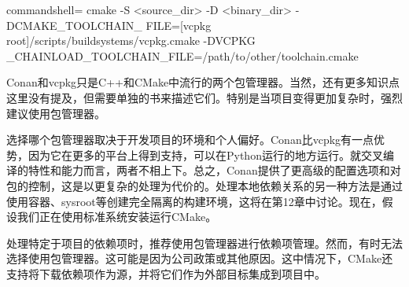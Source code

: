 \begin{tcblisting}{commandshell={}}
cmake -S <source_dir> -D <binary_dir> -DCMAKE_TOOLCHAIN_
  FILE=[vcpkg root]/scripts/buildsystems/vcpkg.cmake -DVCPKG
  _CHAINLOAD_TOOLCHAIN_FILE=/path/to/other/toolchain.cmake
\end{tcblisting}

Conan和vcpkg只是C++和CMake中流行的两个包管理器。当然，还有更多知识点这里没有提及，但需要单独的书来描述它们。特别是当项目变得更加复杂时，强烈建议使用包管理器。

选择哪个包管理器取决于开发项目的环境和个人偏好。Conan比vcpkg有一点优势，因为它在更多的平台上得到支持，可以在Python运行的地方运行。就交叉编译的特性和能力而言，两者不相上下。总之，Conan提供了更高级的配置选项和对包的控制，这是以更复杂的处理为代价的。处理本地依赖关系的另一种方法是通过使用容器、sysroot等创建完全隔离的构建环境，这将在第12章中讨论。现在，假设我们正在使用标准系统安装运行CMake。

处理特定于项目的依赖项时，推荐使用包管理器进行依赖项管理。然而，有时无法选择使用包管理器。这可能是因为公司政策或其他原因。这中情况下，CMake还支持将下载依赖项作为源，并将它们作为外部目标集成到项目中。




